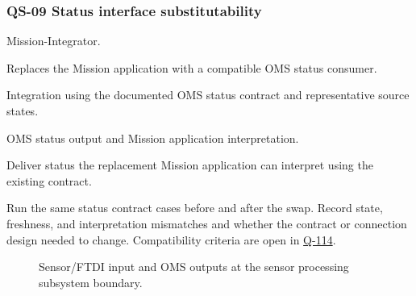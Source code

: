 \subsubsection{QS-09 Status interface substitutability}
\label{Scenario:QS-09}
\begin{description}[leftmargin=0pt,labelindent=0pt,labelsep=0pt,style=nextline]
\item[Stimulus source] Mission-Integrator.
\item[Stimulus] Replaces the Mission application with a compatible OMS status consumer.
\item[Environment] Integration using the documented OMS status contract and representative source states.
\item[Artifact] OMS status output and Mission application interpretation.
\item[Response] Deliver status the replacement Mission application can interpret using the existing contract.
\item[Response measure] Run the same status contract cases before and after the swap. Record state, freshness, and interpretation mismatches and whether the contract or connection design needed to change. Compatibility criteria are open in \hyperref[Question:Q-114]{Q-114}.
\end{description}

\begin{figure}[htbp]\centering

\caption{Sensor/FTDI input and OMS outputs at the sensor processing subsystem boundary.}\label{Figure:UseCaseDiagram}
\end{figure}

